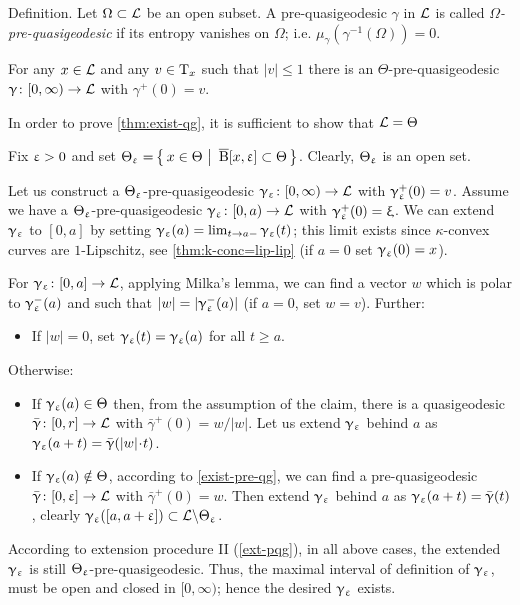 \begin{clm}{Definition.}
Let $\Omega\subset \spc{L}$ be an open subset. 
A pre-quasigeodesic $\gamma$ in $\mathcal{L}$ is called \emph{$\Omega$-pre-quasigeodesic} if  its
entropy vanishes on $\Omega$; 
i.e. $\mu_\gamma(\gamma^{-1}(\Omega))=0$.
\end{clm}

\begin{clm}{}\label{clm:loc-exist} For any $x\in \spc{L}$  and any $v\in \T_x$ such that $|v|\le 1$ there is an $\Theta$-pre-quasigeodesic $\gamma\:[0,\infty)\to \spc{L}$ with $\gamma^+(0)=v$.
\end{clm}

\begin{clm}{}\label{clm:suff-qg-exist} In order to prove \ref{thm:exist-qg}, it is sufficient to show that $\mathcal{L}=\Theta$
\end{clm}

Fix $\upvarepsilon>0$ and set
$\Theta_\eps
=
\set{x\in\Theta}{\cBall[x,\eps]\subset\Theta}$.
Clearly, $\Theta_\upvarepsilon$ is an open set.

Let us construct a $\Theta_\upvarepsilon$-pre-quasigeodesic $\gamma_\eps\:[0,\infty)\to \spc{L}$ with $\upgamma_\upvarepsilon^+(0)=v$.
Assume we have a $\Theta_\upvarepsilon$-pre-quasigeodesic $\gamma_\eps\:[0,a)\to \spc{L}$  with $\upgamma_\upvarepsilon^+(0)=\upxi$.
We can extend $\upgamma_\upvarepsilon$ to $[0,a]$ by setting $\gamma_\eps(a)=\lim_{t\to a-}\gamma_\eps(t)$;
this limit exists since $\kappa$-convex curves are $1$-Lipschitz, see \ref{thm:k-conc=lip-lip}
(if $a=0$ set $\upgamma_\upvarepsilon(0)=x$).

For $\gamma_\eps\:[0,a]\to \spc{L}$, applying Milka's lemma, we can find a vector $w$ which is polar to $\upgamma_\upvarepsilon^-(a)$ and such that $|w|=|\upgamma_\upvarepsilon^-(a)|$ (if $a=0$, set $w=v$). 
Further:
\begin{itemize}
\item If $|w|=0$, set $\upgamma_\upvarepsilon(t)=\upgamma_\upvarepsilon(a)$ for all $t\ge a$. 
\end{itemize}
Otherwise:
\begin{itemize}
\item If $\gamma_\eps(a)\in\Theta$ then, from the assumption of the claim, there is a quasigeodesic $\bar\gamma\:[0,r]\to \spc{L}$ with $\bar\gamma^+(0)=w/|w|$.
Let us extend $\upgamma_\upvarepsilon$ behind $a$ as $\gamma_\eps(a+t)=\bar\gamma(|w|\cdot t)$.
\item If $\upgamma_\upvarepsilon(a)\notin\Theta$, according to \ref{exist-pre-qg},
we can find a pre-quasigeodesic $\bar\gamma\:[0,\eps]\to \spc{L}$ with $\bar\gamma^+(0)=w$.
Then extend $\upgamma_\upvarepsilon$ behind $a$ as $\upgamma_\upvarepsilon(a+t)=\bar{\upgamma}(t)$, clearly $\gamma_\eps([a,a+\eps])\subset \spc{L}\backslash\Theta_\eps$.
\end{itemize}
According to extension procedure II (\ref{ext-pqg}), in all above cases, the extended $\upgamma_\upvarepsilon$ is still $\Theta_\upvarepsilon$-pre-\nospace quasigeodesic.
Thus, the maximal interval of definition of $\upgamma_\upvarepsilon$, must be open and closed in $[0,\infty)$;
hence the desired $\upgamma_\upvarepsilon$ exists.

